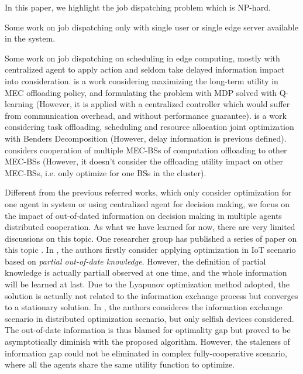 In this paper, we highlight the job dispatching problem which is NP-hard.

Some work on job dispatching only with single user or single edge server available in the system.

Some work on job dispatching on scheduling in edge computing, mostly with centralized agent to apply action and seldom take delayed information impact into consideration.
\cite{ACCESS19-ZhengX} is a work considering maximizing the long-term utility in MEC offloading policy, and formulating the problem with MDP solved with Q-learning (However, it is applied with a centralized controller which would suffer from communication overhead, and without performance guarantee).
\cite{JSAC19-AlameddineHA} is a work considering task offloading, scheduling and resource allocation joint optimization with Benders Decomposition (However, delay information is previous defined).
\cite{Fan2017} considers cooperation of multiple MEC-BSs of computation offloading to other MEC-BSs (However, it doesn't consider the offloading utility impact on other MEC-BSs, i.e. only optimize for one BSs in the cluster).

Different from the previous referred works, which only consider optimization for one agent in system or using centralized agent for decision making, we focus on the impact of out-of-dated information on decision making in multiple agents distributed cooperation.
As what we have learned for now, there are very limited discussions on this topic.
One researcher group has published a series of paper on this topic \cite{JSAC17-LyuX,TOC18-LyuX,TWC18-LyuX}.
In \cite{JSAC17-LyuX}, the authors firstly consider applying optimization in IoT scenario based on \emph{partial out-of-date knowledge}.
However, the definition of partial knowledge is actually partiall observed at one time, and the whole information will be learned at last.
Due to the Lyapunov optimization method adopted, the solution is actually not related to the information exchange process but converges to a stationary solution.
In \cite{TWC18-LyuX}, the authors consideres the information exchange scenario in distributed optimization scenario, but only selfish devices considered.
The out-of-date information is thus blamed for optimality gap but proved to be asymptotically diminish with the proposed algorithm.
However, the staleness of information gap could not be eliminated in complex fully-cooperative scenario, where all the agents share the same utility function to optimize.

